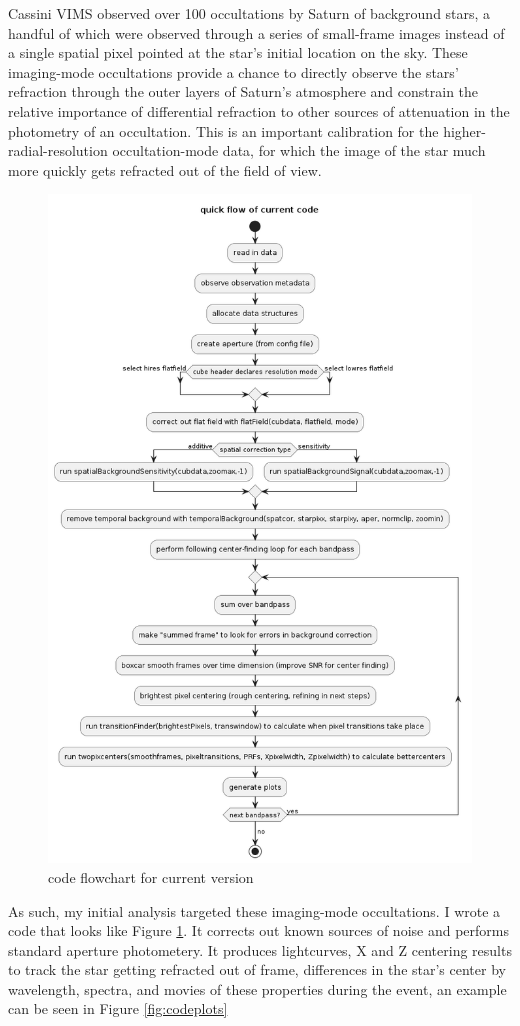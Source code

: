 \documentclass[12pt]{article}
\begin{document}
Cassini VIMS observed over 100 occultations by Saturn of background stars, a
handful of which were observed through a series of small-frame images instead
of a single spatial pixel pointed at the star's initial location on the sky.
These imaging-mode occultations provide a chance to directly observe the stars'
refraction through the outer layers of Saturn's atmosphere and constrain the
relative importance of differential refraction to other sources of attenuation
in the photometry of an occultation. This is an important calibration for the
higher-radial-resolution occultation-mode data, for which the image of the star
much more quickly gets refracted out of the field of view.

\begin{figure}[h!]
  \centering
  \includegraphics[width=0.7\linewidth]{codeflow.png}
  \caption{code flowchart for current version}
  \label{fig:codeoverview}
\end{figure}

As such, my initial analysis targeted these imaging-mode occultations.  I wrote
a code that looks like Figure \ref{fig:codeoverview}. It corrects out known
sources of noise and performs standard aperture photometery. It produces
lightcurves, X and Z centering results to track the star getting refracted out
of frame, differences in the star's center by wavelength, spectra, and movies
of these properties during the event, an example can be seen in Figure \ref{fig:codeplots}
\end{document}
